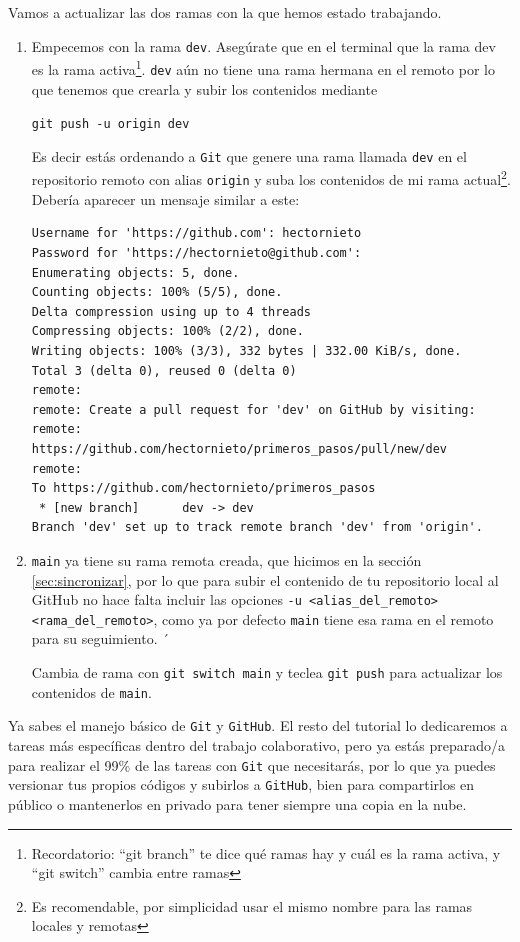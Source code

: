 \documentclass[a4paper,11pt]{report}
\newcommand{\cverb}{\Verb}
\begin{document}
    Vamos a actualizar las dos ramas con la que hemos estado trabajando. 
    \begin{enumerate}
    
     \item Empecemos con la rama \verb+dev+. Asegúrate que en el terminal que la rama dev es la rama activa\footnote{Recordatorio: ``git branch'' te dice qué ramas hay y cuál es la rama activa, y ``git switch'' cambia entre ramas}. \verb+dev+ aún no tiene una rama hermana en el remoto por lo que tenemos que crearla y subir los contenidos mediante
     
     \cverb+git push -u origin dev+
     
     Es decir estás ordenando a \verb+Git+ que genere una rama llamada \verb+dev+ en el repositorio remoto con alias \verb+origin+ y suba los contenidos de mi rama actual\footnote{Es recomendable, por simplicidad usar el mismo nombre para las ramas locales y remotas}. Debería aparecer un mensaje similar a este:
     \begin{lstlisting}[style=custom]
Username for 'https://github.com': hectornieto
Password for 'https://hectornieto@github.com': 
Enumerating objects: 5, done.
Counting objects: 100% (5/5), done.
Delta compression using up to 4 threads
Compressing objects: 100% (2/2), done.
Writing objects: 100% (3/3), 332 bytes | 332.00 KiB/s, done.
Total 3 (delta 0), reused 0 (delta 0)
remote: 
remote: Create a pull request for 'dev' on GitHub by visiting:
remote:      https://github.com/hectornieto/primeros_pasos/pull/new/dev
remote: 
To https://github.com/hectornieto/primeros_pasos
 * [new branch]      dev -> dev
Branch 'dev' set up to track remote branch 'dev' from 'origin'.
     \end{lstlisting}

     
     \item \verb+main+ ya tiene su rama remota creada, que hicimos en la sección \ref{sec:sincronizar}, por lo que para subir el contenido de tu repositorio local al GitHub no hace falta incluir las opciones \verb+-u <alias_del_remoto> <rama_del_remoto>+, como ya por defecto \cverb+main+ tiene esa rama en el remoto para su seguimiento. ´
     
     Cambia de rama con \cverb+git switch main+ y teclea \cverb+git push+ para actualizar los contenidos de \verb+main+.
     
    \end{enumerate}
      
    Ya sabes el manejo básico de \verb+Git+ y \verb+GitHub+. El resto del tutorial lo dedicaremos a tareas más específicas dentro del trabajo colaborativo, pero ya estás preparado/a para realizar el 99\% de las tareas con \verb+Git+ que necesitarás, por lo que ya puedes versionar tus propios códigos  y subirlos a \verb+GitHub+, bien para compartirlos en público o mantenerlos en privado para tener siempre una copia en la nube.
\end{document}
